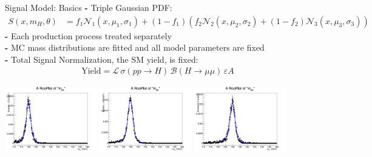 \documentclass[pdf, 9pt]{beamer}
\begin{document}

  \begin{frame}{Signal Model: Basics}
        \textbf{-} Triple Gaussian PDF:\\\vspace{-0.4cm}
        \begin{align}
          S(x, m_{H}, \theta) &= f_{1} \mathcal{N}_{1}(x, \mu_{1}, \sigma_{1}) + (1-f_{1}) \left(f_{2} \mathcal{N}_{2}(x, \mu_{2}, \sigma_{2}) + (1-f_{2}) \mathcal{N}_{3}(x, \mu_{3}, \sigma_{3})\right)
        \end{align}
        \textbf{-} Each production process treated separately\\\vspace{0.2cm}
        \textbf{-} MC mass distributions are fitted and all model parameters are fixed\\\vspace{0.2cm}
        \textbf{-} Total Signal Normalization, the SM yield, is fixed:\\\vspace{-0.4cm}
        \begin{align}
          \text{Yield} = \mathcal{L}\,\sigma(pp\rightarrow H)\, \mathcal{B}(H \rightarrow \mu\mu) \, \varepsilon A
        \end{align}
        \begin{center}
        \includegraphics[width=0.3\textwidth, height=0.3\textheight]{figs/higgs/signalmodel/bdt/bdt_110to160_withSys/signalFit__c0__120__GluGlu__TripleGaus__default.png}
        \includegraphics[width=0.3\textwidth, height=0.3\textheight]{figs/higgs/signalmodel/bdt/bdt_110to160_withSys/signalFit__c0__125__GluGlu__TripleGaus__default.png}
        \includegraphics[width=0.3\textwidth, height=0.3\textheight]{figs/higgs/signalmodel/bdt/bdt_110to160_withSys/signalFit__c0__130__GluGlu__TripleGaus__default.png}
        \end{center}
  \end{frame}
\end{document}
